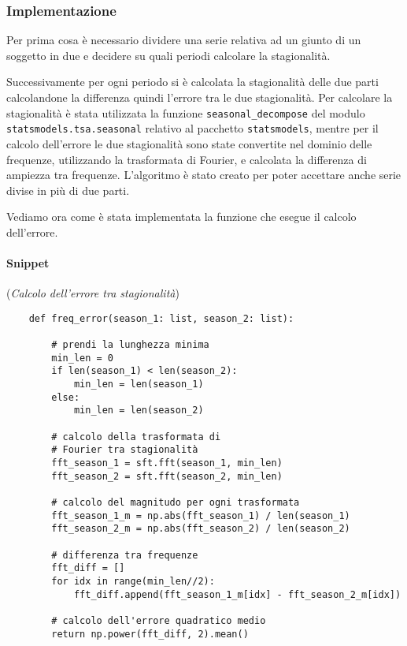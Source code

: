 \subsubsection{Implementazione}
Per prima cosa è necessario dividere una serie relativa ad un giunto di un soggetto in due e decidere
su quali periodi calcolare la stagionalità.

\begin{sloppypar}
Successivamente per ogni periodo si è calcolata la stagionalità delle due parti
calcolandone la differenza quindi l'errore tra le due stagionalità. Per calcolare la stagionalità
è stata utilizzata la funzione \texttt{seasonal\_decompose} del modulo \texttt{statsmodels.tsa.seasonal}
relativo al pacchetto \texttt{statsmodels}, mentre per il calcolo dell'errore
le due stagionalità sono state convertite nel dominio delle frequenze, utilizzando la trasformata
di Fourier, e calcolata la differenza di ampiezza tra frequenze. L'algoritmo è stato 
creato per poter accettare anche serie divise in più di due parti.
\end{sloppypar}

Vediamo ora come è stata implementata la funzione che esegue il calcolo dell'errore.

\paragraph*{Snippet} (\textit{Calcolo dell'errore tra stagionalità})
\begin{verbatim}
    def freq_error(season_1: list, season_2: list):

        # prendi la lunghezza minima 
        min_len = 0
        if len(season_1) < len(season_2):
            min_len = len(season_1)
        else:
            min_len = len(season_2)

        # calcolo della trasformata di 
        # Fourier tra stagionalità
        fft_season_1 = sft.fft(season_1, min_len)
        fft_season_2 = sft.fft(season_2, min_len)

        # calcolo del magnitudo per ogni trasformata
        fft_season_1_m = np.abs(fft_season_1) / len(season_1)
        fft_season_2_m = np.abs(fft_season_2) / len(season_2)

        # differenza tra frequenze
        fft_diff = []
        for idx in range(min_len//2):
            fft_diff.append(fft_season_1_m[idx] - fft_season_2_m[idx])
        
        # calcolo dell'errore quadratico medio
        return np.power(fft_diff, 2).mean() 
\end{verbatim}


